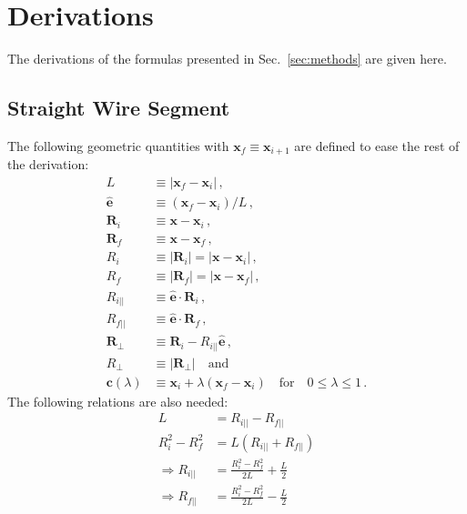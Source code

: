\section{Derivations}
\label{apx:derivations}
The derivations of the formulas presented in Sec.~\ref{sec:methods} are given here.

\subsection{Straight Wire Segment}
The following geometric quantities with $\mathbf{x}_f \equiv \mathbf{x}_{i+1}$ are defined to ease the rest of the derivation:
\begin{align}
 L                   & \equiv | \mathbf{x}_f - \mathbf{x}_i | \, , \\
 \hat{\mathbf{e}}    & \equiv \left(\mathbf{x}_f - \mathbf{x}_i\right) / L \, , \\
 \mathbf{R}_i        & \equiv \mathbf{x} - \mathbf{x}_i \, , \\
 \mathbf{R}_f        & \equiv \mathbf{x} - \mathbf{x}_f \, , \\
 R_i                 & \equiv | \mathbf{R}_i | = | \mathbf{x} - \mathbf{x}_i | \, , \\
 R_f                 & \equiv | \mathbf{R}_f | = | \mathbf{x} - \mathbf{x}_f | \, , \\
 R_{i ||}            & \equiv \hat{\mathbf{e}} \cdot \mathbf{R}_i \, , \\
 R_{f ||}            & \equiv \hat{\mathbf{e}} \cdot \mathbf{R}_f \, , \\
 \mathbf{R}_\perp    & \equiv \mathbf{R}_i - R_{i ||} \hat{\mathbf{e}} \, , \\
 R_\perp             & \equiv | \mathbf{R}_\perp | \quad \mathrm{and} \\
 \mathbf{c}(\lambda) & \equiv \mathbf{x}_i + \lambda \left(\mathbf{x}_f - \mathbf{x}_i\right) \quad \mathrm{for} \quad 0 \leq \lambda \leq 1 \, .
\end{align}
The following relations are also needed:
\begin{align}
       L             & = R_{i ||} - R_{f ||} \\
       R_i^2 - R_f^2 & = L \left( R_{i ||} + R_{f ||} \right) \\
\Rightarrow R_{i ||} & = \frac{R_i^2 - R_f^2}{2 L} + \frac{L}{2} \\
\Rightarrow R_{f ||} & = \frac{R_i^2 - R_f^2}{2 L} - \frac{L}{2}
\end{align}

